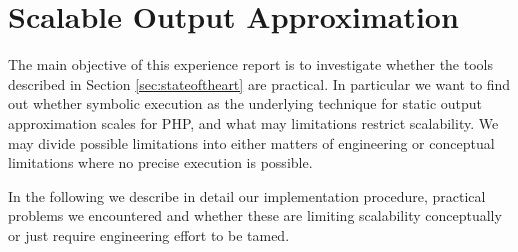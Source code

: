 \documentclass[preprint]{sig-alternate-05-2015}
\begin{document}


\section{Scalable Output Approximation}%
The main objective of this experience report is to investigate whether the tools described in Section \ref{sec:stateoftheart} are practical. In particular we want to find out whether symbolic execution as the underlying technique for static output approximation scales for PHP, and what may limitations restrict scalability. We may divide possible limitations into either matters of engineering or conceptual limitations where no precise execution is possible. 

In the following we describe in detail our implementation procedure, practical problems we encountered and whether these are limiting scalability conceptually or just require engineering effort to be tamed.
\end{document}
